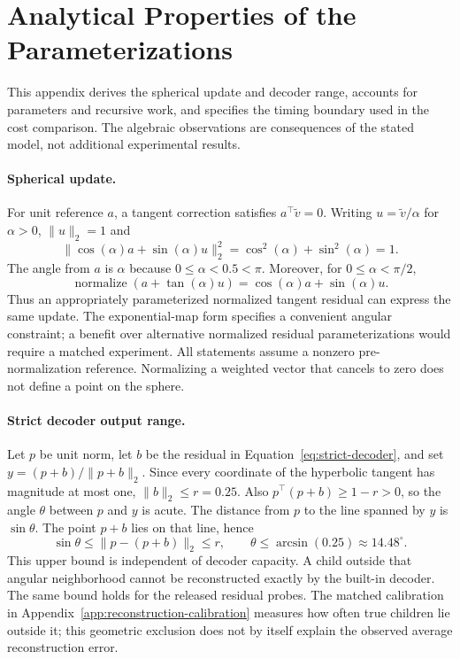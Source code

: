 \documentclass[10pt]{article}
\begin{document}
\section{Analytical Properties of the Parameterizations}
\label{app:geometry}

This appendix derives the spherical update and decoder range, accounts for
parameters and recursive work, and specifies the timing boundary used in the
cost comparison. The algebraic observations are consequences of the stated
model, not additional experimental results.

\paragraph{Spherical update.}
For unit reference \(a\), a tangent correction satisfies
\(a^\top\tilde v=0\). Writing \(u=\tilde v/\alpha\) for \(\alpha>0\),
\(\lVert u\rVert_2=1\) and
\[
 \lVert\cos(\alpha)a+\sin(\alpha)u\rVert_2^2
 =\cos^2(\alpha)+\sin^2(\alpha)=1.
\]
The angle from \(a\) is \(\alpha\) because \(0\leq\alpha<0.5<\pi\).
Moreover, for \(0\leq\alpha<\pi/2\),
\[
 \operatorname{normalize}\!\left(a+\tan(\alpha)u\right)
 =\cos(\alpha)a+\sin(\alpha)u.
\]
Thus an appropriately parameterized normalized tangent residual can express
the same update. The exponential-map form specifies a convenient angular
constraint; a benefit over alternative normalized residual parameterizations
would require a matched experiment. All statements assume a nonzero
pre-normalization reference. Normalizing a weighted vector that cancels to
zero does not define a point on the sphere.

\paragraph{Strict decoder output range.}
Let \(p\) be unit norm, let \(b\) be the residual in
Equation~\eqref{eq:strict-decoder}, and set
\(y=(p+b)/\lVert p+b\rVert_2\). Since every coordinate of the hyperbolic
tangent has magnitude at most one, \(\lVert b\rVert_2\leq r=0.25\).
Also \(p^\top(p+b)\geq1-r>0\), so the angle \(\theta\) between \(p\)
and \(y\) is acute. The distance from \(p\) to the line spanned by \(y\)
is \(\sin\theta\). The point \(p+b\) lies on that line, hence
\[
 \sin\theta\leq\lVert p-(p+b)\rVert_2\leq r,
 \qquad
 \theta\leq\arcsin(0.25)\approx14.48^\circ.
\]
This upper bound is independent of decoder capacity. A child outside that
angular neighborhood cannot be reconstructed exactly by the built-in decoder.
The same bound holds for the released residual probes. The matched calibration
in Appendix~\ref{app:reconstruction-calibration} measures how often true children
lie outside it; this geometric exclusion does not by itself explain the observed
average reconstruction error.
\end{document}
